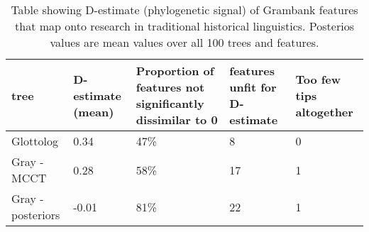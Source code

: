 \begin{table}[ht]
\centering
\begin{tabular}{p{4.5cm}p{2.2cm}p{2.2cm}p{2.2cm}p{2.2cm}}
  \hline
tree & D-estimate (mean) & Proportion of features not significantly dissimilar to 0 & features unfit for D-estimate & Too few tips altogether \\ 
  \hline
Glottolog & 0.34 & 47\% & 8 & 0 \\ 
  Gray - MCCT & 0.28 & 58\% & 17 & 1 \\ 
  Gray - posteriors & -0.01 & 81\% & 22 & 1 \\ 
   \hline
\end{tabular}
\caption{Table showing D-estimate (phylogenetic signal) of Grambank features that map onto research in traditional historical linguistics. Posterios values are mean values over all 100 trees and features.} 
\label{d_estimate_summary}
\end{table}
